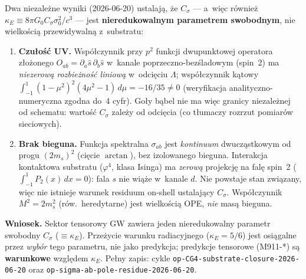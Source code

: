 \begin{remark}\label{rem:sigma-Csigma-free}
Dwa niezale\.zne wyniki (2026-06-20) ustalaj\k{a}, \.ze $C_\sigma$
--- a~wi\k{e}c r\'ownie\.z $\kappa_E \equiv 8\pi G_0 C_\sigma
\sigma_0^2/c^3$ --- jest \textbf{nieredukowalnym parametrem
swobodnym}, nie wielko\'sci\k{a} przewidywaln\k{a} z~substratu:
\begin{enumerate}
\item \textbf{Czu\l{}o\'s\'c UV.} Wsp\'o\l{}czynnik przy $p^2$
  funkcji dwupunktowej operatora z\l{}o\.zonego
  $O_{ab} = \partial_a\hat s\,\partial_b\hat s$ w~kanale
  poprzeczno-bez\'sladowym (spin~2) ma \emph{niezerow\k{a}
  rozbie\.zno\'s\'c liniow\k{a}} w~odci\k{e}ciu $\Lambda$;
  wsp\'o\l{}czynnik k\k{a}towy
  $\int_{-1}^{1}(1-\mu^2)^2(4\mu^2-1)\,d\mu = -16/35 \neq 0$
  (weryfikacja analityczno-numeryczna zgodna do~4 cyfr).
  Go\l{}y b\k{a}bel nie ma wi\k{e}c granicy niezale\.znej od schematu:
  warto\'s\'c $C_\sigma$ zale\.zy od odci\k{e}cia (co t\l{}umaczy
  rozrzut pomiar\'ow sieciowych).
\item \textbf{Brak bieguna.} Funkcja spektralna $\sigma_{ab}$ jest
  \emph{kontinuum} dwucz\k{a}stkowym od progu $(2m_s)^2$
  (ci\k{e}cie $\arctan$), bez izolowanego bieguna. Interakcja
  kontaktowa substratu ($\varphi^4$, klasa Isinga) ma \emph{zerow\k{a}}
  projekcj\k{e} na fal\k{e} spin~2 ($\int_{-1}^{1}P_2(x)\,dx = 0$):
  fala $s$ nie wi\k{a}\.ze w~kanale $d$. Nie powstaje stan zwi\k{a}zany,
  wi\k{e}c nie istnieje warunek residuum on-shell ustalaj\k{a}cy
  $C_\sigma$. Wsp\'o\l{}czynnik $M^2 = 2m_s^2$ (r\'ow.~heredytarne)
  jest wielko\'sci\k{a} OPE, \emph{nie} mas\k{a} bieguna.
\end{enumerate}
\noindent\textbf{Wniosek.} Sektor tensorowy GW zawiera jeden
nieredukowalny parametr swobodny $C_\sigma$ ($\equiv\kappa_E$).
Prze\.zycie warunku radiacyjnego ($\kappa_E = 5/6$) jest osi\k{a}galne
przez \emph{wyb\'or} tego parametru, nie jako predykcja; predykcje
tensorowe (M911-*) s\k{a} \textbf{warunkowe} wzgl\k{e}dem $\kappa_E$.
Pe\l{}ny zapis: cykle \texttt{op-CG4-substrate-closure-2026-06-20}
oraz \texttt{op-sigma-ab-pole-residue-2026-06-20}.


\end{remark}
